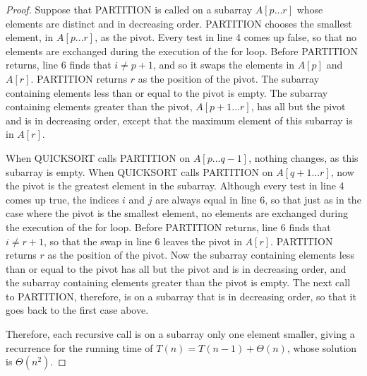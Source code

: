 \documentclass{article}
\begin{document}
\begin{proof}
%
Suppose that PARTITION is called on a subarray $A[p...r]$ whose elements are distinct and in decreasing order. PARTITION chooses the smallest element, in $A[p...r]$, as the pivot. Every test in line 4 comes up false, so that no elements are exchanged during the execution of the for loop. Before PARTITION returns, line 6 finds that $i \neq p + 1$, and so it swaps the elements in $A[p]$ and $A[r]$. PARTITION returns $r$ as the position of the pivot. The subarray containing elements less than or equal to the pivot is empty. The subarray containing elements greater than the pivot, $A[p+1...r]$, has all but the pivot and is in decreasing order, except that the maximum element of this subarray is in $A[r]$.

When QUICKSORT calls PARTITION on $A[p...q-1]$, nothing changes, as this subarray is empty. When QUICKSORT calls PARTITION on $A[q+1...r]$, now the pivot is the greatest element in the subarray. Although every test in line 4 comes up true, the indices $i$ and $j$ are always equal in line 6, so that just as in the case where the pivot is the smallest element, no elements are exchanged during the execution of the for loop. Before PARTITION returns, line 6 finds that $i \neq r + 1$, so that the swap in line 6 leaves the pivot in $A[r]$. PARTITION returns $r$ as the position of the pivot. Now the subarray containing elements less than or equal to the pivot has all but the pivot and is in decreasing order, and the subarray containing elements greater than the pivot is empty. The next call to PARTITION, therefore, is on a subarray that is in decreasing order, so that it goes back to the first case above.

Therefore, each recursive call is on a subarray only one element smaller, giving a recurrence for the running time of $T(n) = T(n-1) + \Theta(n)$, whose solution is $\Theta(n^2)$.
\end{proof}

\newpage 
%
\end{document}
